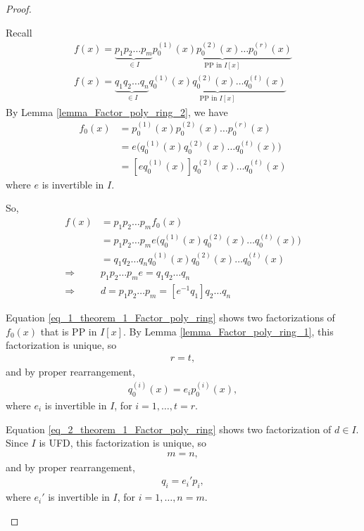 \documentclass[utf8]{ctexbook}
\theoremstyle{definition}
\begin{document}
\begin{proof}
\begin{enumerate}
{\begin{itemize}
{Recall
\begin{align*}
f(x) = \underbrace{p_1 p_2 \ldots p_m}_{\in I}  \underbrace{p_0 ^{(1)} (x) p_0 ^{(2)} (x) \ldots p_0 ^{(r)} (x) }_{\mbox{PP in } I[x]} \\
f(x) = \underbrace{q_1 q_2 \ldots q_n}_{\in I}  \underbrace{q_0 ^{(1)} (x) q_0 ^{(2)} (x) \ldots q_0 ^{(t)} (x) }_{\mbox{PP in } I[x]}
\end{align*}
By Lemma \ref{lemma_Factor_poly_ring_2}, we have
\begin{align}
f_0 (x) &= p_0 ^{(1)} (x) p_0 ^{(2)} (x) \ldots p_0 ^{(r)} (x) \nonumber \\
&= e \Big( q_0 ^{(1)} (x) q_0 ^{(2)} (x) \ldots q_0 ^{(t)} (x)  \Big) \nonumber \\
&= [e q_0 ^{(1)} (x) ] q_0 ^{(2)} (x) \ldots q_0 ^{(t)} (x)  \label{eq_1_theorem_1_Factor_poly_ring}
\end{align}
where $e$ is invertible in $I$.

So,
\begin{align}
f(x) &= p_1 p_2 \ldots p_m f_0 (x) \nonumber \\
&= p_1 p_2 \ldots p_m e \Big( q_0 ^{(1)} (x) q_0 ^{(2)} (x) \ldots q_0 ^{(t)} (x)  \Big) \nonumber \\
&=  q_1 q_2 \ldots q_n q_0 ^{(1)} (x) q_0 ^{(2)} (x) \ldots q_0 ^{(t)} (x) \nonumber \\
\Longrightarrow & p_1 p_2 \ldots p_m e  = q_1 q_2 \ldots q_n  \nonumber \\
\Longrightarrow & d = p_1 p_2 \ldots p_m = [e^{-1}  q_1] q_2 \ldots q_n \label{eq_2_theorem_1_Factor_poly_ring} 
\end{align}

Equation \ref{eq_1_theorem_1_Factor_poly_ring} shows two factorizations of $f_0 (x)$ that is PP in $I[x]$. By Lemma \ref{lemma_Factor_poly_ring_1}, this factorization is unique, so
\begin{align*}
r = t ,
\end{align*}
and by proper rearrangement,
\begin{align*}
q_0 ^{(i)} (x) = e_i p_0 ^{(i)} (x),
\end{align*}
where $e_i$ is invertible in $I$, for $i = 1, \ldots, t=r $.

Equation \ref{eq_2_theorem_1_Factor_poly_ring} shows two factorization of $d \in I$. Since $I$ is UFD, this factorization is unique, so
\begin{align*}
m = n,
\end{align*}
and by proper rearrangement,
\begin{align*}
q_i = e_i ' p_i ,
\end{align*}
where $e_i '$ is invertible in $I$, for $i = 1, \ldots, n=m $.

}
\end{itemize}}
\end{enumerate}
\end{proof}
\end{document}
